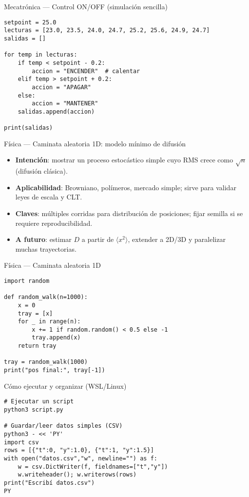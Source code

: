 \documentclass[aspectratio=169,professionalfonts]{beamer}
\begin{document}
\begin{frame}[fragile]{Mecatrónica — Control ON/OFF (simulación sencilla)}
\begin{verbatim}
setpoint = 25.0
lecturas = [23.0, 23.5, 24.0, 24.7, 25.2, 25.6, 24.9, 24.7]
salidas = []

for temp in lecturas:
    if temp < setpoint - 0.2:
        accion = "ENCENDER"  # calentar
    elif temp > setpoint + 0.2:
        accion = "APAGAR"
    else:
        accion = "MANTENER"
    salidas.append(accion)

print(salidas)
\end{verbatim}
\end{frame}

\begin{frame}{Física — Caminata aleatoria 1D: modelo mínimo de difusión}
\begin{itemize}
  \item \textbf{Intención}: mostrar un proceso estocástico simple cuyo RMS crece como \(\sqrt{n}\) (difusión clásica).
  \item \textbf{Aplicabilidad}: Browniano, polímeros, mercado simple; sirve para validar leyes de escala y CLT.
  \item \textbf{Claves}: múltiples corridas para distribución de posiciones; fijar semilla si se requiere reproducibilidad.
  \item \textbf{A futuro}: estimar $D$ a partir de \(\langle x^2\rangle\), extender a 2D/3D y paralelizar muchas trayectorias.
\end{itemize}
\end{frame}

\begin{frame}[fragile]{Física — Caminata aleatoria 1D}
\begin{verbatim}
import random

def random_walk(n=1000):
    x = 0
    tray = [x]
    for _ in range(n):
        x += 1 if random.random() < 0.5 else -1
        tray.append(x)
    return tray

tray = random_walk(1000)
print("pos final:", tray[-1])
\end{verbatim}
\end{frame}

\begin{frame}[fragile]{Cómo ejecutar y organizar (WSL/Linux)}
\begin{verbatim}
# Ejecutar un script
python3 script.py

# Guardar/leer datos simples (CSV)
python3 - << 'PY'
import csv
rows = [{"t":0, "y":1.0}, {"t":1, "y":1.5}]
with open("datos.csv","w", newline="") as f:
    w = csv.DictWriter(f, fieldnames=["t","y"])
    w.writeheader(); w.writerows(rows)
print("Escribí datos.csv")
PY
\end{verbatim}
\end{frame}
\end{document}
